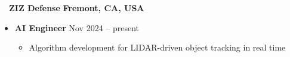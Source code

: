 ~~{\color{black}\textbf{ZIZ Defense} \hfill  \textbf{Fremont, CA, USA}}\par
\begin{itemize}
    \item
        \textbf{AI Engineer}
        \hfill  {Nov 2024 -- present} \par
        \begin{itemize}
            \item   Algorithm development for LIDAR-driven object tracking in real time
        \end{itemize}
\end{itemize}
